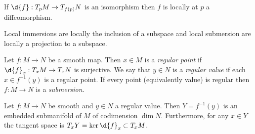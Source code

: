 \documentclass[12pt]{article}
\begin{document}
\begin{corollary}
If $\d{f} : T_p M \to T_{f(p)} N$ is an isomorphism then $f$ is locally at $p$ a diffeomorphism.
\end{corollary}

\begin{corollary}
Local immersions are locally the inclusion of a subspace and local submersion are locally a projection to a subspace. 
\end{corollary}

\begin{definition}
Let $f : M \to N$ be a smooth map. Then $x \in M$ is a \textit{regular point} if $\d{f}_x : T_x M \to T_x N$ is surjective. We say that $y \in N$ is a \textit{regular value} if each $x \in f^{-1}(y)$ is a regular point. If every point (equivalently value) is regular then $f : M \to N$ is a \textit{submersion}. 
\end{definition}

\begin{theorem}[Preimage]
Let $f : M \to N$ be smooth and $y \in N$ a regular value. Then $Y = f^{-1}(y)$ is an embedded submanifold of $M$ of codimension $\dim{N}$. Furthermore, for any $x \in Y$ the tangent space is $T_x Y = \ker{\d{f}_x} \subset T_x M$. 
\end{theorem}
\end{document}
